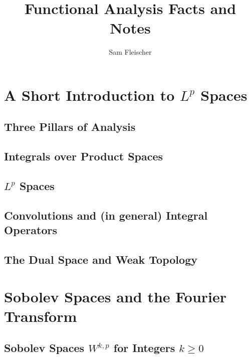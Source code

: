 \documentclass[12pt]{article}
\author{Sam Fleischer}
\title{Functional Analysis Facts and Notes}
\begin{document}
\maketitle

\section{A Short Introduction to $L^p$ Spaces}

\subsection{Three Pillars of Analysis}

\subsection{Integrals over Product Spaces}

\subsection{$L^p$ Spaces}

\subsection{Convolutions and (in general) Integral Operators}

\subsection{The Dual Space and Weak Topology}

\section{Sobolev Spaces and the Fourier Transform}

\subsection{Sobolev Spaces $W^{k,p}$ for Integers $k \geq 0$}
\end{document}
